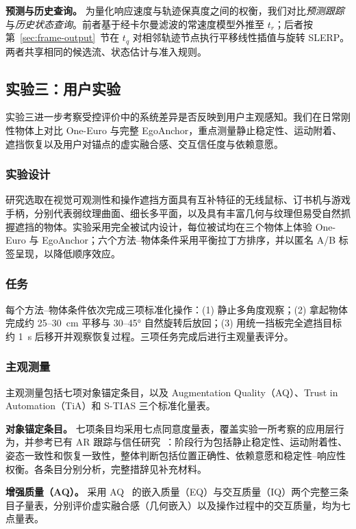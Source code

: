 \documentclass[review]{vgtc}
\begin{document}
\textbf{预测与历史查询。}
为量化响应速度与轨迹保真度之间的权衡，我们对比\emph{预测跟踪}与\emph{历史状态查询}。前者基于经卡尔曼滤波的常速度模型外推至 $t_r$；后者按第~\ref{sec:frame-output}~节在 $t_q$ 对相邻轨迹节点执行平移线性插值与旋转 SLERP。两者共享相同的候选流、状态估计与准入规则。

\subsection{实验三：用户实验}\label{sec:exp3-design}

实验三进一步考察受控评价中的系统差异是否反映到用户主观感知。我们在日常刚性物体上对比 One-Euro 与完整 EgoAnchor，重点测量静止稳定性、运动附着、遮挡恢复以及用户对锚点的虚实融合感、交互信任度与依赖意愿。

\subsubsection{实验设计}

研究选取在视觉可观测性和操作遮挡方面具有互补特征的无线鼠标、订书机与游戏手柄，分别代表弱纹理曲面、细长多平面，以及具有丰富几何与纹理但易受自然抓握遮挡的物体。实验采用完全被试内设计，每位被试均在三个物体上体验 One-Euro 与 EgoAnchor；六个方法--物体条件采用平衡拉丁方排序，并以匿名 A/B 标签呈现，以降低顺序效应。

\subsubsection{任务}

每个方法--物体条件依次完成三项标准化操作：(1) 静止多角度观察；(2) 拿起物体完成约 25--30~cm 平移与 30--45° 自然旋转后放回；(3) 用统一挡板完全遮挡目标约 1~s 后移开并观察恢复过程。三项任务完成后进行主观量表评分。

\subsubsection{主观测量}

主观测量包括七项对象锚定条目，以及 Augmentation Quality（AQ）、Trust in Automation（TiA）和 S-TIAS 三个标准化量表。

\textbf{对象锚定条目。}
七项条目均采用七点同意度量表，覆盖实验一所考察的应用层行为，并参考已有 AR 跟踪与信任研究~\cite{trustar2024}：阶段行为包括静止稳定性、运动附着性、姿态一致性和恢复一致性，整体判断包括位置正确性、依赖意愿和稳定性--响应性权衡。各条目分别分析，完整措辞见补充材料。

\textbf{增强质量（AQ）。}
采用 AQ~\cite{aq2026} 的嵌入质量（EQ）与交互质量（IQ）两个完整三条目子量表，分别评价虚实融合感（几何嵌入）以及操作过程中的交互质量，均为七点量表。
\end{document}
